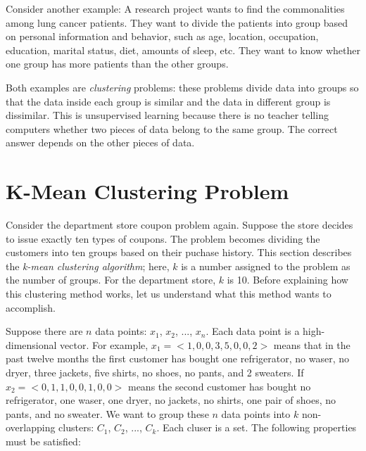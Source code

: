 Consider another example: A research project wants to find the
commonalities among lung cancer patients. They want to divide the
patients into group based on personal information and behavior, such
as age, location, occupation, education, marital status, diet, amounts
of sleep, etc. They want to know whether one group has more patients
than the other groups.

Both examples are {\it clustering} problems: these problems divide
data into groups so that the data inside each group is similar and the
data in different group is dissimilar.  This is unsupervised learning
because there is no teacher telling computers whether two pieces of
data belong to the same group.  The correct answer depends on the
other pieces of data.  

\section{K-Mean Clustering Problem}

Consider the department store coupon problem again. Suppose the store
decides to issue exactly ten types of coupons.  The problem becomes
dividing the customers into ten groups based on their puchase history.
This section describes the {\it k-mean clustering algorithm}; here,
$k$  is a number assigned to
the problem as the number of groups.  For the department store, $k$ is
10.  Before explaining how this clustering method works, let us
understand what this method wants to accomplish.

Suppose there are $n$ data points: $x_1$, $x_2$, ..., $x_n$. Each data
point is a high-dimensional vector.  For example, $x_1 = <1, 0, 0, 3,
5, 0, 0, 2>$ means that in the past twelve months the first customer
has bought one refrigerator, no waser, no dryer, three jackets, five
shirts, no shoes, no pants, and 2 sweaters.  If $x_2 = <0, 1, 1, 0, 0,
1, 0, 0>$ means the second customer has bought no refrigerator, one
waser, one dryer, no jackets, no shirts, one pair of shoes, no pants,
and no sweater.  We want to group these $n$ data points into $k$
non-overlapping clusters: $C_1$, $C_2$, ..., $C_k$.  Each cluser is a
set.   The following
properties must be satisfied:

